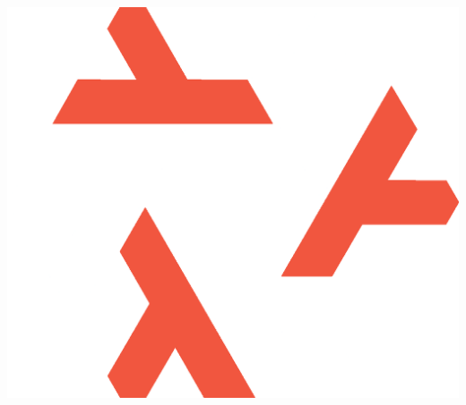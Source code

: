 \documentclass[12pt,aspectratio=169]{beamer}
\begin{document}
\begin{frame}[standout]
\vfill
\includegraphics[height=0.50\paperheight]{pulumi-images/nixos-logo-white-hires.png}
\end{frame}

\end{document}
